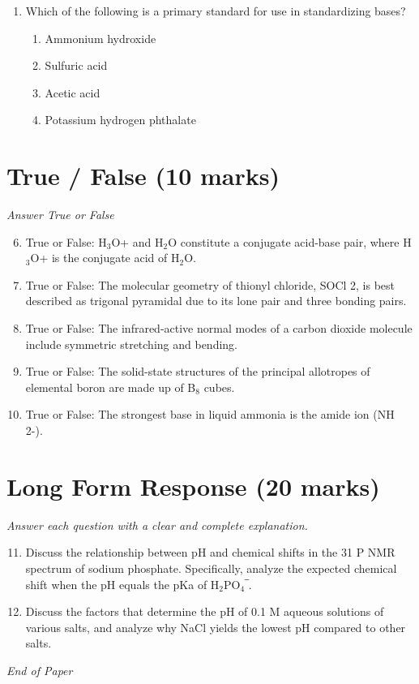 \documentclass[12pt]{article}
\begin{document}
\begin{enumerate}[label=\arabic*.]
\begin{enumerate}[label=(\alph*)]
    \item a halogenated hydrocarbon
    \item lead
    \item mercury
\end{enumerate}
\item Which of the following is a primary standard for use in standardizing bases?
\begin{enumerate}[label=(\alph*)]
    \item Ammonium hydroxide
    \item Sulfuric acid
    \item Acetic acid
    \item Potassium hydrogen phthalate
\end{enumerate}
\end{enumerate}

\section*{True / False (10 marks)}
\textit{Answer True or False}
\begin{enumerate}[label=\arabic*.]
\setcounter{enumi}{5}
\item True or False: H$_{3}$O+ and H$_{2}$O constitute a conjugate acid-base pair, where H$_{3}$O+ is the conjugate acid of H$_{2}$O.
\item True or False: The molecular geometry of thionyl chloride, SOCl 2, is best described as trigonal pyramidal due to its lone pair and three bonding pairs.
\item True or False: The infrared-active normal modes of a carbon dioxide molecule include symmetric stretching and bending.
\item True or False: The solid-state structures of the principal allotropes of elemental boron are made up of B$_{8}$ cubes.
\item True or False: The strongest base in liquid ammonia is the amide ion (NH 2-).
\end{enumerate}

\section*{Long Form Response (20 marks)}
\textit{Answer each question with a clear and complete explanation.}
\begin{enumerate}[label=\arabic*.]
\setcounter{enumi}{10}
\item Discuss the relationship between pH and chemical shifts in the 31 P NMR spectrum of sodium phosphate. Specifically, analyze the expected chemical shift when the pH equals the pKa of H$_{2}$PO$_{4}$‾.
\item Discuss the factors that determine the pH of 0.1 M aqueous solutions of various salts, and analyze why NaCl yields the lowest pH compared to other salts.
\end{enumerate}

\vfill
\noindent\textit{End of Paper}
\end{document}
